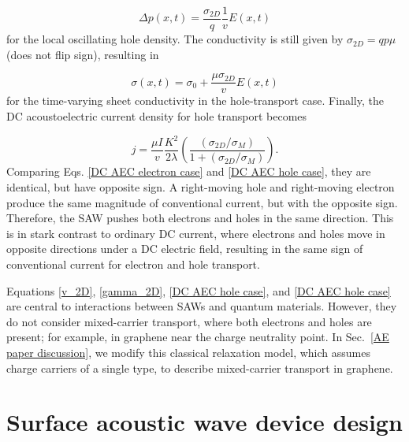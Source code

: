 \documentclass[double,12pt,1in,seploa]{beavtex}
\let\Oldsection\section
\renewcommand{\section}{\FloatBarrier\Oldsection}
\begin{document}
\begin{equation}
    \Delta p(x,t) = \frac{\sigma_{2D}}{q} \frac{1}{v}E(x,t)
\end{equation}
for the local oscillating hole density. The conductivity is still given by $\sigma_{2D} = q p \mu$ (does not flip sign), resulting in

\begin{equation}
    \sigma(x,t)= \sigma_0 + \frac{\mu \sigma_{2D}}{v}E(x,t)
\end{equation}
for the time-varying sheet conductivity in the hole-transport case. Finally, the DC acoustoelectric current density for hole transport becomes

\begin{equation}
    j = \frac{\mu I}{v} \frac{K^2}{2\lambda}(\frac{(\sigma_{2D}/\sigma_M)}{1+(\sigma_{2D}/\sigma_M)}). \label{DC AEC hole case}
\end{equation}
Comparing Eqs. \ref{DC AEC electron case} and \ref{DC AEC hole case}, they are identical, but have opposite sign. A right-moving hole and right-moving electron produce the same magnitude of conventional current, but with the opposite sign. Therefore, the SAW pushes both electrons and holes in the same direction. This is in stark contrast to ordinary DC current, where electrons and holes move in opposite directions under a DC electric field, resulting in the same sign of conventional current for electron and hole transport.

Equations \ref{v_2D}, \ref{gamma_2D}, \ref{DC AEC hole case}, and \ref{DC AEC hole case} are central to interactions between SAWs and quantum materials. However, they do not consider mixed-carrier transport, where both electrons and holes are present; for example, in graphene near the charge neutrality point. In Sec.\ \ref{AE paper discussion}, we modify this classical relaxation model, which assumes charge carriers of a single type, to describe mixed-carrier transport in graphene.


\section{Surface acoustic wave device design} \label{SAW device design}
\end{document}
